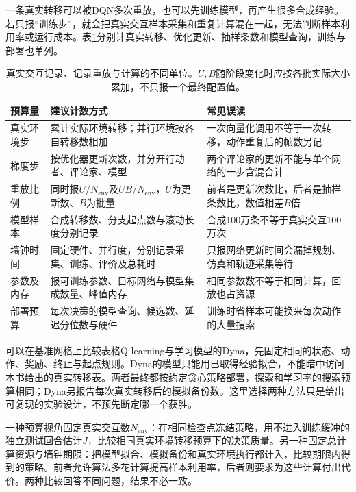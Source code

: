 一条真实转移可以被DQN多次重放，也可以先训练模型，再产生很多合成经验。若只报“训练步”，就会把真实交互样本采集和重复计算混在一起，无法判断样本利用率或运行成本。表\ref{tab:rl-learning-budget-units}分别计真实转移、优化更新、抽样条数和模型查询，训练与部署也单列。

\begin{table}[t]
  \centering
  \small
  \begin{tabularx}{\linewidth}{>{\raggedright\arraybackslash}p{27mm} >{\raggedright\arraybackslash}X >{\raggedright\arraybackslash}X}
    \toprule
    预算量 & 建议计数方式 & 常见误读 \\
    \midrule
    真实环境步 & 累计实际环境转移；并行环境按各自转移数相加 & 一次向量化调用不等于一次转移，动作重复后的帧数另记 \\
    梯度步 & 按优化器更新次数，并分开行动者、评论家、模型 & 两个评论家的更新不能与单个网络的一步含混合计 \\
    重放比例 & 同时报$U/N_{\mathrm{env}}$及$UB/N_{\mathrm{env}}$，$U$为更新数、$B$为批量 & 前者是更新次数比，后者是抽样条数比，数值相差$B$倍 \\
    模型样本 & 合成转移数、分支起点数与滚动长度分别记录 & 合成100万条不等于真实交互100万次 \\
    墙钟时间 & 固定硬件、并行度，分别记录采集、训练、评价及总耗时 & 只报网络更新时间会漏掉规划、仿真和轨迹采集等待 \\
    参数及内存 & 报可训练参数、目标网络与模型集成数量、峰值内存 & 相同参数数不等于相同计算，回放也占资源 \\
    部署预算 & 每次决策的模型查询、候选数、延迟分位数与硬件 & 训练时省样本可能换来每次动作的大量搜索 \\
    \bottomrule
  \end{tabularx}
  \caption{真实交互记录、记录重放与计算的不同单位。$U,B$随阶段变化时应按各批实际大小累加，不只报一个最终配置值。}
  \label{tab:rl-learning-budget-units}
\end{table}

可以在基准网格上比较表格Q-learning与学习模型的Dyna，先固定相同的状态、动作、奖励、终止与起点规则。Dyna的模型只能用已取得经验拟合，不能暗中访问本书给出的真实转移表。两者最终都按约定贪心策略部署，探索和学习率的搜索预算相同；Dyna另报告每次真实转移后的模拟备份数。这里选择两种方法只是给出可复现的实验设计，不预先断定哪一个获胜。

一种预算视角固定真实交互数$N_{\mathrm{env}}$：在相同检查点冻结策略，用不进入训练缓冲的独立测试回合估计$J$，比较相同真实环境转移预算下的决策质量。另一种固定总计算资源与墙钟期限：把模型拟合、模拟备份和真实环境执行都计入，比较期限内得到的策略。前者允许算法多花计算提高样本利用率，后者则要求为这些计算付出代价。两种比较回答不同问题，结果不必一致。

